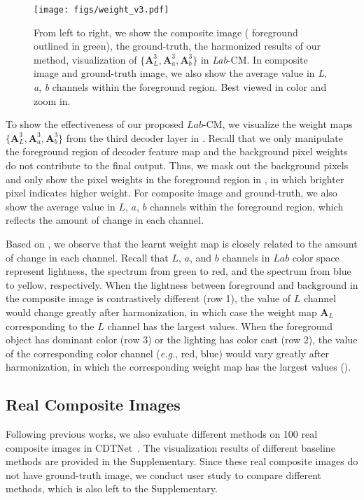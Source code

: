 \documentclass[sigconf]{acmart}
\begin{document}
\begin{figure}[t]
  \centering
  \texttt{[image: figs/weight\_v3.pdf]}
  \caption{From left to right, we show the composite image ( foreground outlined  in green), the ground-truth, the harmonized results of our method, visualization of $\{\bm{A}_{\textit{L}}^{3}, \bm{A}_{\textit{a}}^{3}, \bm{A}_{\textit{b}}^{3}\}$ in \textit{Lab}-CM. In composite image and ground-truth image, we also show the average value in \textit{L}, \textit{a}, \textit{b} channels within the foreground region. Best viewed in color and zoom in.}
  \Description{}
  \label{fig:weight_visual}
\end{figure}

To show the effectiveness of our proposed $Lab$-CM, we visualize the weight maps $\{\bm{A}_{\textit{L}}^{3}, \bm{A}_{\textit{a}}^{3}, \bm{A}_{\textit{b}}^{3}\}$ from the third decoder layer in . Recall that we only manipulate the foreground region of decoder feature map and the background pixel weights do not contribute to the final output. Thus, we mask out the background pixels and only show the pixel weights in the foreground region in , in which brighter pixel indicates higher weight.
For composite image and ground-truth, we also show the average value in $L$, $a$, $b$ channels within the foreground region, which reflects the amount of change in each channel. 

Based on , we observe that the learnt weight map is closely related to the amount of change in each channel. 
Recall that $L$, $a$, and $b$ channels in $Lab$ color space represent lightness, the spectrum from green to red, and the spectrum from blue to yellow, respectively. 
When the lightness between foreground and background in the composite image is contrastively different (row 1), the value of $L$ channel would change greatly after harmonization, in which case the weight map $\bm{A}_{L}$ corresponding to the $L$ channel has the largest values. 
When the foreground object has dominant color (row 3) or the lighting has color cast (row 2),  the value of the corresponding color channel (\emph{e.g.}, red, blue) would vary greatly after harmonization, in which the corresponding weight map has the largest values ().

\subsection{Real Composite Images}
Following previous works, we also evaluate different methods on 100 real composite images in CDTNet~\cite{CDTNet}.  The visualization results of different baseline methods are provided in the Supplementary.
Since these real composite images do not have ground-truth image, we conduct user study to compare different methods, which is also left to the Supplementary. 
\end{document}
